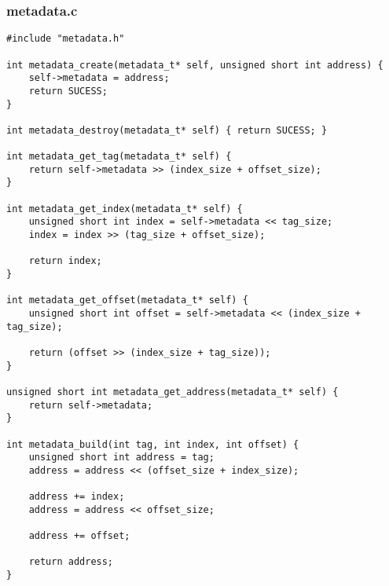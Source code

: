 \documentclass[a4paper,10pt]{article}
\begin{document}
    \subsubsection{metadata.c}
    \begin{verbatim}
#include "metadata.h"

int metadata_create(metadata_t* self, unsigned short int address) {
	self->metadata = address;
	return SUCESS;
}

int metadata_destroy(metadata_t* self) { return SUCESS; }

int metadata_get_tag(metadata_t* self) {
	return self->metadata >> (index_size + offset_size);
}

int metadata_get_index(metadata_t* self) {
	unsigned short int index = self->metadata << tag_size;
	index = index >> (tag_size + offset_size);

	return index;
}

int metadata_get_offset(metadata_t* self) {
	unsigned short int offset = self->metadata << (index_size + tag_size);

	return (offset >> (index_size + tag_size));
}

unsigned short int metadata_get_address(metadata_t* self) {
	return self->metadata;
}

int metadata_build(int tag, int index, int offset) {
	unsigned short int address = tag;
	address = address << (offset_size + index_size);

	address += index;
	address = address << offset_size;	

	address += offset;

	return address;
}
    \end{verbatim}
\end{document}

